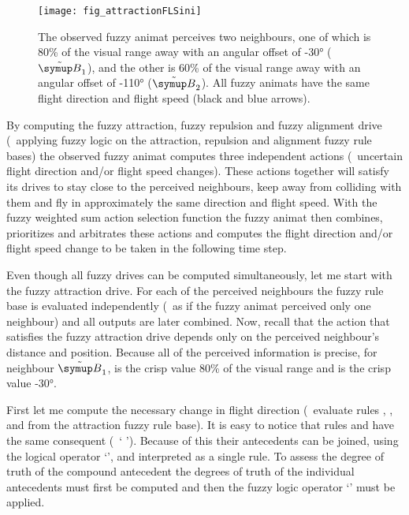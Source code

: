 \begin{figure}
  \texttt{[image: fig\_attractionFLSini]}
  \caption{The observed fuzzy animat perceives two neighbours, one of which is 80\% of the visual range away with an angular offset of \ang{-30} ($\fautom{B}_1$), and the other is 60\% of the visual range away with an angular offset of \ang{-110} ($\fautom{B}_2$). All fuzzy animats have the same flight direction and flight speed (black and blue arrows).}
  \label{fig:attraction:FLS:ini}
\end{figure}

By computing the fuzzy attraction, fuzzy repulsion and fuzzy alignment drive (\ie\ applying fuzzy logic on the attraction, repulsion and alignment fuzzy rule bases) the observed fuzzy animat computes three independent actions (\ie\ uncertain flight direction and/or flight speed changes). These actions together will satisfy its drives to stay close to the perceived neighbours, keep away from colliding with them and fly in approximately the same direction and flight speed. With the fuzzy weighted sum action selection function the fuzzy animat then combines, prioritizes and arbitrates these actions and computes the flight direction and/or flight speed change to be taken in the following time step.

Even though all fuzzy drives can be computed simultaneously, let me start with the fuzzy attraction drive. For each of the perceived neighbours the fuzzy rule base is evaluated independently (\ie\ as if the fuzzy animat perceived only one neighbour) and all outputs are later combined. Now, recall that the action that satisfies the fuzzy attraction drive depends only on the perceived neighbour's distance and position. Because all of the perceived information is precise, for neighbour $\fautom{B}_1$,  is the crisp value 80\% of the visual range and  is the crisp value \ang{-30}.

First let me compute the necessary change in flight direction (\ie\ evaluate rules , ,  and  from the attraction fuzzy rule base). It is easy to notice that rules  and  have the same consequent (\ie\ `  '). Because of this their antecedents can be joined, using the logical operator `', and interpreted as a single rule. To assess the degree of truth of the compound antecedent the degrees of truth of the individual antecedents must first be computed and then the fuzzy logic operator `' must be applied.

